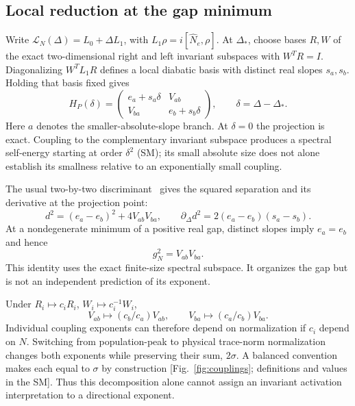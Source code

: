 \documentclass[aps,pra,twocolumn,superscriptaddress,amsmath,amssymb,reprint,floatfix]{revtex4-2}
\newcommand{\Lc}{\mathcal L}
\begin{document}
\subsection{Local reduction at the gap minimum}
Write $\Lc_N(\Delta)=L_0+\Delta L_1$, with $L_1\rho=i[\hat N_e,\rho]$. At $\Delta_*$, choose bases $R,W$ of the exact two-dimensional right and left invariant subspaces with $W^TR=I$. Diagonalizing $W^TL_1R$ defines a local diabatic basis with distinct real slopes $s_a,s_b$. Holding that basis fixed gives
\begin{equation}
 H_P(\delta)=
 \begin{pmatrix}e_a+s_a\delta&V_{ab}\\V_{ba}&e_b+s_b\delta\end{pmatrix},
 \qquad \delta=\Delta-\Delta_*.
 \label{eq:two}
\end{equation}
Here $a$ denotes the smaller-absolute-slope branch. At $\delta=0$ the projection is exact. Coupling to the complementary invariant subspace produces a spectral self-energy starting at order $\delta^2$ (SM); its small absolute size does not alone establish its smallness relative to an exponentially small coupling.

The usual two-by-two discriminant~\cite{Heiss2012} gives the squared separation and its derivative at the projection point:
\begin{equation}
 d^2=(e_a-e_b)^2+4V_{ab}V_{ba},
 \qquad
 \partial_\Delta d^2=2(e_a-e_b)(s_a-s_b).
\end{equation}
At a nondegenerate minimum of a positive real gap, distinct slopes imply $e_a=e_b$ and hence
\begin{equation}
 \boxed{g_N^2=V_{ab}V_{ba}.}
 \label{eq:product}
\end{equation}
This identity uses the exact finite-size spectral subspace. It organizes the gap but is not an independent prediction of its exponent.

Under $R_i\mapsto c_iR_i$, $W_i\mapsto c_i^{-1}W_i$,
\begin{equation}
 V_{ab}\mapsto(c_b/c_a)V_{ab},\qquad
 V_{ba}\mapsto(c_a/c_b)V_{ba}.
\end{equation}
Individual coupling exponents can therefore depend on normalization if $c_i$ depend on $N$. Switching from population-peak to physical trace-norm normalization changes both exponents while preserving their sum, $2\sigma$. A balanced convention makes each equal to $\sigma$ by construction [Fig.~\ref{fig:couplings}; definitions and values in the SM]. Thus this decomposition alone cannot assign an invariant activation interpretation to a directional exponent.
\end{document}
